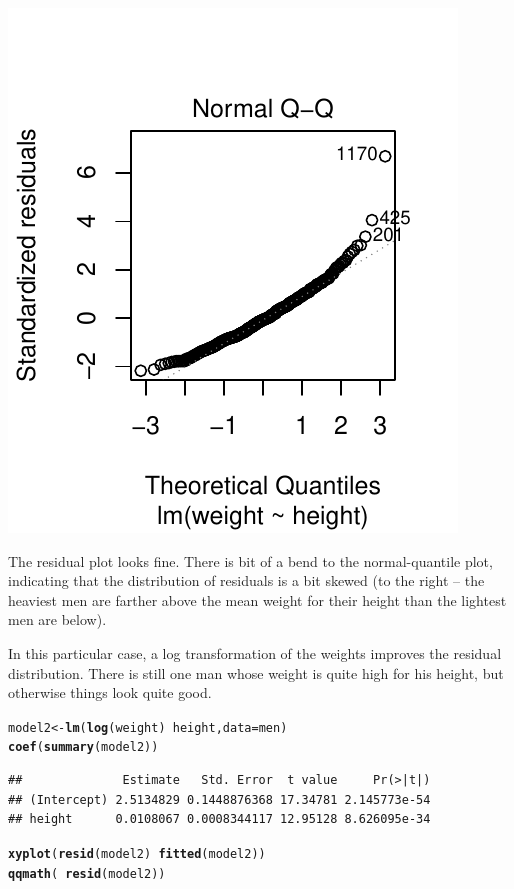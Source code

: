 \documentclass[twoside]{book}\usepackage[]{graphicx}\usepackage[]{xcolor}
\makeatletter
\def\maxwidth{ %
  \ifdim\Gin@nat@width>\linewidth
    \linewidth
  \else
    \Gin@nat@width
  \fi
}
\newcommand{\hlopt}[1]{\textcolor[rgb]{0,0,0}{#1}}%
\newcommand{\hlstd}[1]{\textcolor[rgb]{0.345,0.345,0.345}{#1}}%
\newcommand{\hlkwb}[1]{\textcolor[rgb]{0.69,0.353,0.396}{#1}}%
\newcommand{\hlkwc}[1]{\textcolor[rgb]{0.333,0.667,0.333}{#1}}%
\newcommand{\hlkwd}[1]{\textcolor[rgb]{0.737,0.353,0.396}{\textbf{#1}}}%
\newenvironment{kframe}{%
 \def\at@end@of@kframe{}%
 \ifinner\ifhmode%
  \def\at@end@of@kframe{\end{minipage}}%
  \begin{minipage}{\columnwidth}%
 \fi\fi%
 \def\FrameCommand##1{\hskip\@totalleftmargin \hskip-\fboxsep
 \colorbox{shadecolor}{##1}\hskip-\fboxsep
     \hskip-\linewidth \hskip-\@totalleftmargin \hskip\columnwidth}%
 \MakeFramed {\advance\hsize-\width
   \@totalleftmargin\z@ \linewidth\hsize
   \@setminipage}}%
 {\par\unskip\endMakeFramed%
 \at@end@of@kframe}
\newenvironment{knitrout}{}{} %
\makeatother
\begin{document}
\begin{solution}
\begin{enumerate}
\begin{knitrout}
{\includegraphics[width=\maxwidth]{figures/fig-unnamed-chunk-195-2} 

}



\end{knitrout}
The residual plot looks fine.  There is bit of a bend to the normal-quantile plot, indicating
that the distribution of residuals is a bit skewed (to the right -- the heaviest men are farther above
the mean weight for their height than the lightest men are below).

In this particular case, a log transformation of the weights improves the
residual distribution.  There is still one man whose weight is quite high for
his height, but otherwise things look quite good.
\begin{knitrout}
\color{fgcolor}\begin{kframe}
\begin{alltt}
\hlstd{model2} \hlkwb{<-} \hlkwd{lm}\hlstd{(}\hlkwd{log}\hlstd{(weight)} \hlopt{~} \hlstd{height,} \hlkwc{data} \hlstd{= men)}
\hlkwd{coef}\hlstd{(}\hlkwd{summary}\hlstd{(model2))}
\end{alltt}
\begin{verbatim}
##              Estimate   Std. Error  t value     Pr(>|t|)
## (Intercept) 2.5134829 0.1448876368 17.34781 2.145773e-54
## height      0.0108067 0.0008344117 12.95128 8.626095e-34
\end{verbatim}
\begin{alltt}
\hlkwd{xyplot}\hlstd{(}\hlkwd{resid}\hlstd{(model2)} \hlopt{~} \hlkwd{fitted}\hlstd{(model2))}
\hlkwd{qqmath}\hlstd{(}\hlopt{~}\hlkwd{resid}\hlstd{(model2))}
\end{alltt}
\end{kframe}


\end{knitrout}
\end{enumerate}
\end{solution}
\end{document}
